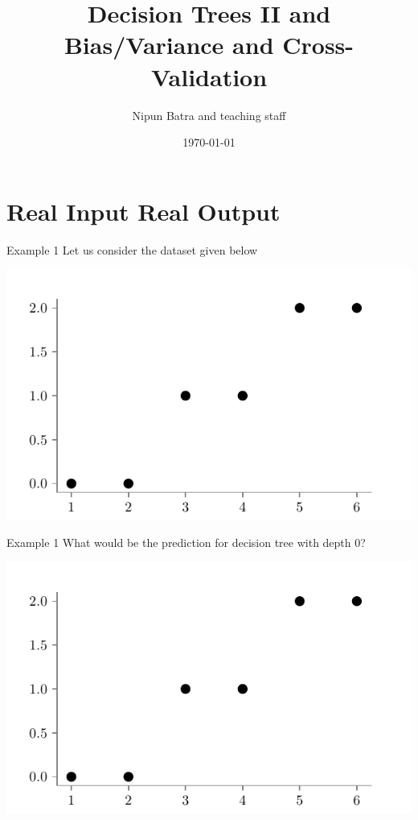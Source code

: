 \documentclass{beamer}
\title{Decision Trees II and Bias/Variance and Cross-Validation}
\date{\today}
\author{Nipun Batra and teaching staff}
\institute{IIT Gandhinagar}
\begin{document}
	\maketitle
	
	




\section{Real Input Real Output}

\begin{frame}{Example 1}
Let us consider the dataset given below
\begin{center}
\includegraphics{../figures/decision-trees/ri-ro-dataset.pdf}
\end{center}
\end{frame}

\begin{frame}{Example 1}
What would be the prediction for decision tree with depth 0?
\begin{center}
\includegraphics{../figures/decision-trees/ri-ro-dataset.pdf}
\end{center}
\end{frame}
\end{document}
